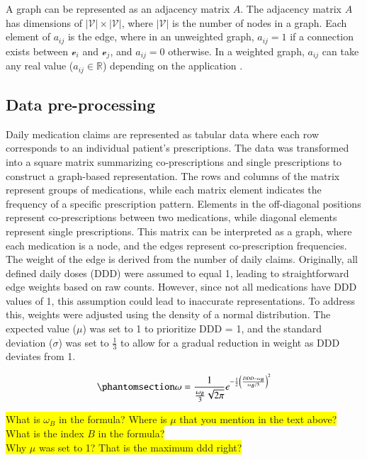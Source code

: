 \documentclass[
  authoryear,
  review]{elsarticle}
\begin{document}
A graph can be represented as an adjacency matrix \(A\). The adjacency
matrix \(A\) has dimensions of \(|\mathcal{V}| \times |\mathcal{V}|\),
where \(|\mathcal{V}|\) is the number of nodes in a graph. Each element
of \(a_{ij}\) is the edge, where in an unweighted graph, \(a_{ij} = 1\)
if a connection exists between \(\mathcal{v}_i\) and \(\mathcal{v}_j\),
and \(a_{ij} = 0\) otherwise. In a weighted graph, \(a_{ij}\) can take
any real value (\(a_{ij} \in \mathbb{R}\)) depending on the application
\citep{estrada2012structure}.

\subsection{Data pre-processing}\label{data-pre-processing}

Daily medication claims are represented as tabular data where each row
corresponds to an individual patient's prescriptions. The data was
transformed into a square matrix summarizing co-prescriptions and single
prescriptions to construct a graph-based representation. The rows and
columns of the matrix represent groups of medications, while each matrix
element indicates the frequency of a specific prescription pattern.
Elements in the off-diagonal positions represent co-prescriptions
between two medications, while diagonal elements represent single
prescriptions. This matrix can be interpreted as a graph, where each
medication is a node, and the edges represent co-prescription
frequencies. The weight of the edge is derived from the number of daily
claims. Originally, all defined daily doses (DDD) were assumed to equal
1, leading to straightforward edge weights based on raw counts. However,
since not all medications have DDD values of 1, this assumption could
lead to inaccurate representations. To address this, weights were
adjusted using the density of a normal distribution. The expected value
(\(\mu\)) was set to 1 to prioritize DDD = 1, and the standard deviation
(\(\sigma\)) was set to \(\frac{1}{3}\) to allow for a gradual reduction
in weight as DDD deviates from 1.

\begin{equation}\phantomsection\label{eq-weighted-DDD}{\omega = \frac{1}{\frac{\omega_B}{3} \sqrt{2 \pi}} e^{-\frac{1}{2}\left(\frac{DDD - \omega_B}{\omega_B/3}\right)^2}}\end{equation}

\colorbox{yellow}{What is $\omega_B$ in the formula? Where is $\mu$ that you mention in the text above?}
\colorbox{yellow}{What is the index $B$ in the formula?}\\
\colorbox{yellow}{Why $\mu$ was set to 1? That is the maximum ddd right?}
\end{document}
